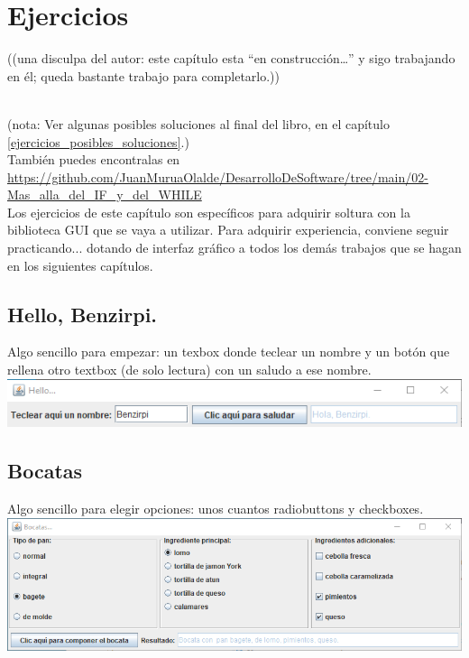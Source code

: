 \documentclass[spanish,12pt,a4paper,final,oneside]{book}
\begin{document}
\chapter{Ejercicios}\label{ejercicios_gui}

\begin{footnotesize}((una disculpa del autor: este capítulo esta ``en construcción\ldots'' y sigo trabajando en él; queda bastante trabajo para completarlo.))\end{footnotesize}
\\

(nota: Ver algunas posibles soluciones al final del libro, en el capítulo \ref{ejercicios_posibles_soluciones}.)
\\{\scriptsize También puedes encontralas en \url{https://github.com/JuanMuruaOlalde/DesarrolloDeSoftware/tree/main/02-Mas_alla_del_IF_y_del_WHILE}}
\\

Los ejercicios de este capítulo son específicos para adquirir soltura con la biblioteca GUI que se vaya a utilizar. Para adquirir experiencia, conviene seguir practicando... dotando de interfaz gráfico a todos los demás trabajos que se hagan en los siguientes capítulos.


\section{Hello, Benzirpi.}\label{ejercicio_hellobenzirpi}
Algo sencillo para empezar: un texbox donde teclear un nombre y un botón que rellena otro textbox (de solo lectura) con un saludo a ese nombre.
\\ \includegraphics[width=\textwidth]{HelloBenzirpi - pantallazo - Java}

\section{Bocatas}\label{ejercicio_bocatas}
Algo sencillo para elegir opciones: unos cuantos radiobuttons y checkboxes.
\\ \includegraphics[width=\textwidth]{Bocatas - pantallazo - Java}
\end{document}
